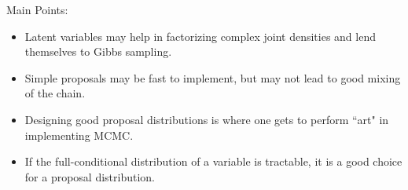 Main Points:
\begin{itemize}
\item Latent variables may help in factorizing complex joint densities and lend themselves to Gibbs sampling.
\item Simple proposals may be fast to implement, but may not lead to good mixing of the chain.
\item Designing good proposal distributions is where one gets to perform ``art" in implementing MCMC.
\item If the full-conditional distribution of a variable is tractable, it is a good choice for a proposal distribution.
\end{itemize}



